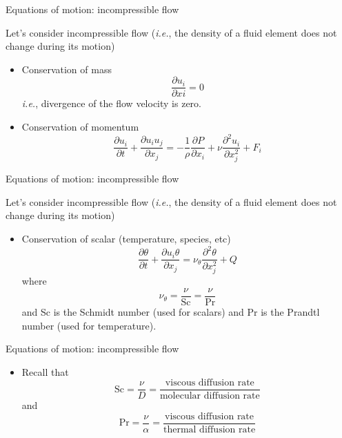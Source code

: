 \begin{frame}{Equations of motion: incompressible flow}

Let's consider incompressible flow (\textit{i.e.}, the density of a fluid element does not change during its motion)
\begin{itemize}
	\item Conservation of mass $$\frac{\partial u_i}{\partial xi} = 0$$
	 \textit{i.e.}, divergence of the flow velocity is zero.
	\item Conservation of momentum $$\frac{\partial u_i}{\partial t} + \frac{\partial u_i u_j}{\partial x_j} = -\frac{1}{\rho} \frac{\partial P}{\partial x_i} + \nu \frac{\partial^2 u_i}{\partial x_j^2} + F_i$$
\end{itemize}
\end{frame}

\begin{frame}{Equations of motion: incompressible flow}

Let's consider incompressible flow (\textit{i.e.}, the density of a fluid element does not change during its motion)
\begin{itemize}
	\item Conservation of scalar (temperature, species, etc)$$\frac{\partial \theta}{\partial t} + \frac{\partial u_i \theta}{\partial x_j} = \nu_{\theta}\frac{\partial^2 \theta}{\partial x_j^2} + Q$$
	where $$\nu_{\theta} = \frac{\nu}{\text{Sc}} = \frac{\nu}{\text{Pr}}$$
	and Sc is the Schmidt number (used for scalars) and Pr is the Prandtl number (used for temperature).
\end{itemize}
\end{frame}

\begin{frame}{Equations of motion: incompressible flow}

\begin{itemize}
	\item Recall that
	$$\text{Sc} = \frac{\nu}{D} = \frac{\text{viscous diffusion rate}}{\text{molecular diffusion rate}}$$
	and $$\text{Pr} = \frac{\nu}{\alpha} = \frac{\text{viscous diffusion rate}}{\text{thermal diffusion rate}}$$
\end{itemize}
\end{frame}

